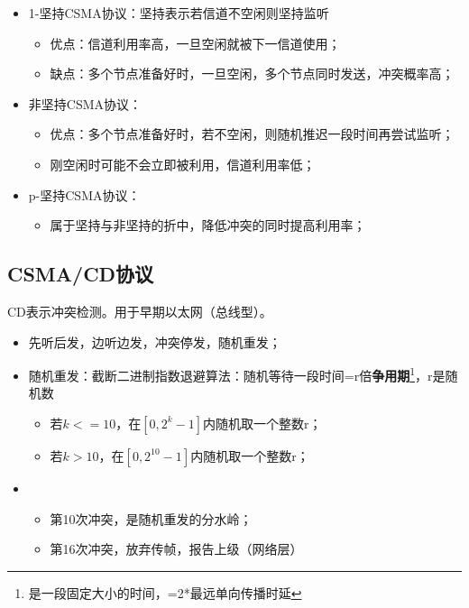 \begin{itemize}
    \item 1-坚持CSMA协议：坚持表示若信道不空闲则坚持监听\begin{itemize}
        \item 优点：信道利用率高，一旦空闲就被下一信道使用；
        \item 缺点：多个节点准备好时，一旦空闲，多个节点同时发送，冲突概率高；
    \end{itemize}
    \item 非坚持CSMA协议：\begin{itemize}
        \item 优点：多个节点准备好时，若不空闲，则随机推迟一段时间再尝试监听；
        \item 刚空闲时可能不会立即被利用，信道利用率低；
    \end{itemize}
    \item p-坚持CSMA协议：\begin{itemize}
        \item 属于坚持与非坚持的折中，降低冲突的同时提高利用率；
    \end{itemize}
\end{itemize}


\subsection{CSMA/CD协议}
CD表示冲突检测。用于早期以太网（总线型）。

\begin{itemize}
    \item 先听后发，边听边发，冲突停发，随机重发；
    \item 随机重发：截断二进制指数退避算法：随机等待一段时间=r倍\textbf{争用期}\footnote{是一段固定大小的时间，=2*最远单向传播时延}，r是随机数\begin{itemize}
        \item 若\(k <= 10\)，在\([0, 2^k - 1]\)内随机取一个整数r；
        \item 若\(k > 10\)，在\([0, 2^{10} - 1]\)内随机取一个整数r；
    \end{itemize}
    \item \begin{itemize}
        \item 第10次冲突，是随机重发的分水岭；
        \item 第16次冲突，放弃传帧，报告上级（网络层）
    \end{itemize}
\end{itemize}

